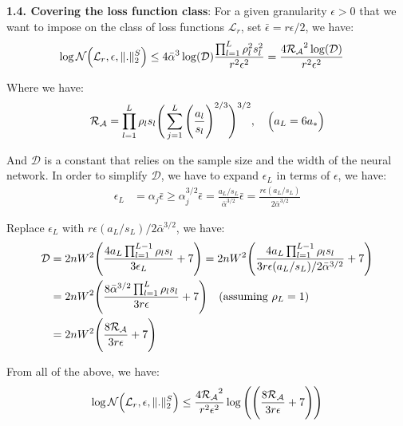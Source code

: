 \noindent\newline\textbf{1.4. Covering the loss function class}: For a given granularity $\epsilon>0$ that we want to impose on the class of loss functions $\mathcal{L}_r$, set $\bar\epsilon=r\epsilon/2$, we have:
\begin{align*}
    \log\mathcal{N}\Big( 
        \mathcal{L}_r, \epsilon, \|.\|_2^S
     \Big) &\le 4\bar\alpha^3\log(\mathcal{D})\frac{\prod_{l=1}^L\rho_l^2s_l^2}{r^2\epsilon^2} = \frac{4\mathcal{R_A}^2\log(\mathcal{D})}{r^2\epsilon^2}
\end{align*}

\noindent Where we have:
\begin{align*}
    \mathcal{R_A} = \prod_{l=1}^L\rho_ls_l \Bigg( 
        \sum_{j=1}^L \Bigg( 
            \frac{a_l}{s_l}
         \Bigg)^{2/3}
     \Bigg)^{3/2}, \ \ \ \Big( a_L = 6a_* \Big)
\end{align*}

\noindent And $\mathcal{D}$ is a constant that relies on the sample size and the width of the neural network. In order to simplify $\mathcal{D}$, we have to expand $\epsilon_L$ in terms of $\epsilon$, we have:
\begin{align*}
    \epsilon_L &= \alpha_j \bar\epsilon \ge \alpha_j^{3/2}\bar\epsilon = \frac{a_L/s_L}{\bar\alpha^{3/2}}\bar\epsilon = \frac{r\epsilon(a_L/s_L)}{2\bar\alpha^{3/2}} 
\end{align*}

\noindent Replace $\epsilon_L$ with ${r\epsilon(a_L/s_L)}/{2\bar\alpha^{3/2}}$, we have:
\begin{align*}
    \mathcal{D} &= 2nW^2\Bigg( 
        \frac{4a_L\prod_{l=1}^{L-1}\rho_ls_l}{3\epsilon_L} + 7
     \Bigg) = 2nW^2\Bigg( 
        \frac{4a_L\prod_{l=1}^{L-1}\rho_ls_l}{3r\epsilon(a_L/s_L)/2\bar\alpha^{3/2}} + 7
     \Bigg) \\
    &= 2nW^2\Bigg( 
        \frac{8\bar\alpha^{3/2}\prod_{l=1}^L \rho_ls_l}{3r\epsilon} + 7
     \Bigg) \ \ \ (\text{assuming } \rho_L=1) \\
    &= 2nW^2\Bigg( 
        \frac{8\mathcal{R_A}}{3r\epsilon} + 7
     \Bigg)
\end{align*}

\noindent From all of the above, we have:
\begin{align*}
    \log\mathcal{N}\Big( \mathcal{L}_r, \epsilon, \|.\|_2^S \Big) \le \frac{4\mathcal{R_A}^2}{r^2\epsilon^2}\log\Bigg( 
        \Bigg( 
            \frac{8\mathcal{R_A}}{3r\epsilon} + 7
         \Bigg)
     \Bigg)
\end{align*}
